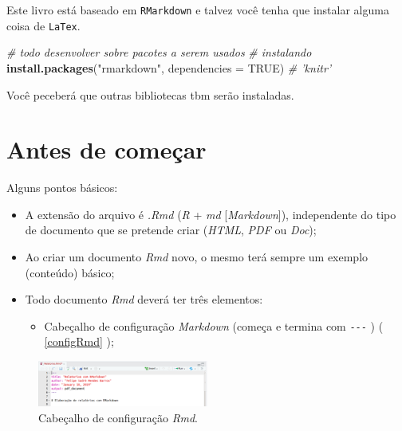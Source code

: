 \documentclass[]{book}
\newenvironment{Shaded}{\begin{snugshade}}{\end{snugshade}}
\newcommand{\CommentTok}[1]{\textcolor[rgb]{0.56,0.35,0.01}{\textit{#1}}}
\newcommand{\DataTypeTok}[1]{\textcolor[rgb]{0.13,0.29,0.53}{#1}}
\newcommand{\KeywordTok}[1]{\textcolor[rgb]{0.13,0.29,0.53}{\textbf{#1}}}
\newcommand{\NormalTok}[1]{#1}
\newcommand{\OtherTok}[1]{\textcolor[rgb]{0.56,0.35,0.01}{#1}}
\newcommand{\StringTok}[1]{\textcolor[rgb]{0.31,0.60,0.02}{#1}}
\providecommand{\tightlist}{%
  \setlength{\itemsep}{0pt}\setlength{\parskip}{0pt}}
\begin{document}
Este livro está baseado em \texttt{RMarkdown} e talvez você tenha que instalar alguma coisa de \texttt{LaTex}.

\begin{Shaded}
\begin{Highlighting}[]
\CommentTok{# todo desenvolver sobre pacotes a serem usados}
\CommentTok{# instalando}
\KeywordTok{install.packages}\NormalTok{(}\StringTok{"rmarkdown"}\NormalTok{, }\DataTypeTok{dependencies =} \OtherTok{TRUE}\NormalTok{)}
\CommentTok{# 'knitr'}
\end{Highlighting}
\end{Shaded}

Você peceberá que outras bibliotecas tbm serão instaladas.

\hypertarget{AntesComecar}{%
\chapter{Antes de começar}\label{AntesComecar}}

Alguns pontos básicos:

\begin{itemize}
\tightlist
\item
  A extensão do arquivo é \emph{.Rmd} (\emph{R} + \emph{md} {[}\emph{Markdown}{]}), independente do tipo de documento que se pretende criar (\emph{HTML}, \emph{PDF} ou \emph{Doc});\\
\item
  Ao criar um documento \emph{Rmd} novo, o mesmo terá sempre um exemplo (conteúdo) básico;\\
\item
  Todo documento \emph{Rmd} deverá ter três elementos:

  \begin{itemize}
  \tightlist
  \item
    Cabeçalho de configuração \emph{Markdown} (começa e termina com \texttt{-\/-\/-} ) ( \autoref{configRmd} );
  \end{itemize}
\end{itemize}

\begin{figure}
\centering
\includegraphics[width=0.5\textwidth,height=\textheight]{./img/CabecalhoConfig.png}
\caption{Cabeçalho de configuração \emph{Rmd}. \label{configRmd}}
\end{figure}
\end{document}
